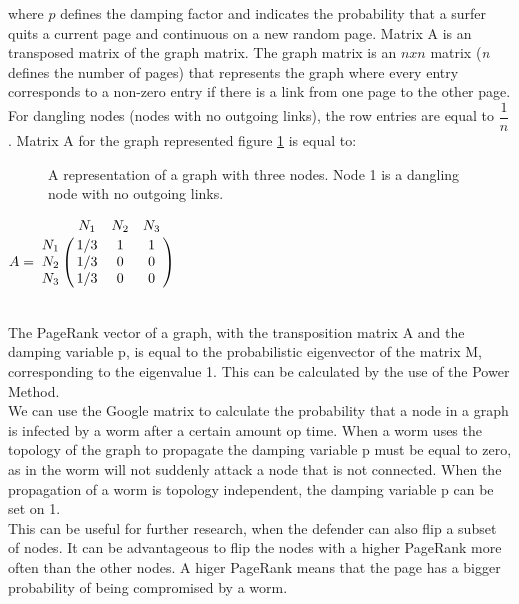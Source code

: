 where $p$ defines the damping factor and indicates the probability that a surfer quits a current page and continuous on a new random page. Matrix A is an transposed matrix of the graph matrix. The graph matrix is an $n x n$ matrix (\textit{n} defines the number of pages) that represents the graph where every entry corresponds to a non-zero entry if there is a link from one page to the other page. For dangling nodes (nodes with no outgoing links), the row entries are equal to $\dfrac{1}{n}$. Matrix A for the graph represented figure \ref{GoogleMatrix} is equal to:


\begin{figure}
\centering
{}
\caption{A representation of a graph with three nodes. Node 1 is a dangling node with no outgoing links.}
\label{GoogleMatrix}
\end{figure}

$ A =
\bordermatrix{
         & N_1		& N_2	& N_3	 \cr
    N_1   & 1/3		& 1		& 1			     \cr
    N_2   & 1/3		& 0		& 0		     \cr
    N_3   & 1/3		& 0		& 0		 \cr
  }$ 
 
~~\\

The PageRank vector of a graph, with the transposition matrix A and the damping variable p, is equal to the probabilistic eigenvector of the matrix M, corresponding to the eigenvalue 1. This can be calculated by the use of the Power Method. \\

We can use the Google matrix to calculate the probability that a node in a graph is infected by a worm after a certain amount op time. When a worm uses the topology of the graph to propagate the damping variable p must be equal to zero, as in the worm will not suddenly attack a node that is not connected. When the propagation of a worm is topology independent, the damping variable p can be set on 1. \\
This can be useful for further research, when the defender can also flip a subset of nodes. It can be advantageous to flip the nodes with a higher PageRank more often than the other nodes. A higer PageRank means that the page has a bigger probability of being compromised by a worm. 
